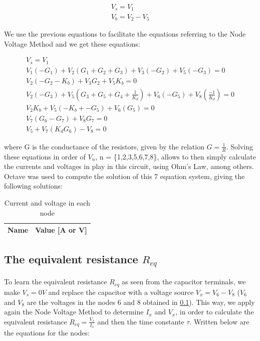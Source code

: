 \begin{center}
  \begin{gather*}
    V_s=V_1 \\ V_b=V_2-V_5
  \end{gather*}
\end{center}

\par We use the previous equations to facilitate the equations referring
to the Node Voltage Method and we get these equations:

\begin{center}
  \begin{gather*}
    V_s = V_1 \\
    V_1(-G_1)+V_2(G_1+G_2+G_3)+V_3(-G_2)+V_5(-G_3)=0 \\
    V_2(-G_2-K_b)+V_3G_2+V_5K_b=0 \\
    V_2(-G_3)+V_5(G_3+G_5+G_4+\frac{1}{K_d})+V_6(-G_5)+V_8(\frac{-1}{K_d})=0 \\
    V_2K_b+V_5(-K_b+-G_5)+V_6(G_5)=0 \\
    V_7(G_6-G_7)+V_8G_7=0 \\
    V_5+V_7(K_dG_6)-V_8=0
  \end{gather*}
\end{center}


where G is the conductance of the resistors, given by the relation $G = \frac{1}{R}$. Solving these equations in
order of $V_n$, n = \{1,2,3,5,6,7,8\}, allows to then simply calculate the currents and voltages in play in
this circuit, using Ohm's Law, among others. Octave was used to compute the solution of this 7 equation system,
giving the following solutions:

\begin{table}
  \centering
  \begin{tabular}{|l|r|}
    \hline
    {\bf Name} & {\bf Value [A or V]} \\ \hline
    
  \end{tabular}
  \caption{Current and voltage in each node}
  \label{tab:op}
\end{table}


\subsection{The equivalent resistance $R_{eq}$} \label{2.2}


\paragraph{} To learn the equivalent resistance $R_{eq}$ as seen from the capacitor terminals, we make $V_s=0 V$ and
replace the capacitor with a voltage source $V_x=V_6-V_8$ ($V_6$ and $V_8$ are the voltages
in the nodes 6 and 8 obtained in \ref{2.2}). This way, we apply again the Node Voltage Method to
determine $I_x$ and $V_x$, in order to calculate the equivalent resistance $R_{eq} = \frac{V_x}{I_x}$ and then the time constante
$\tau$. Written below are the equations for the nodes:

